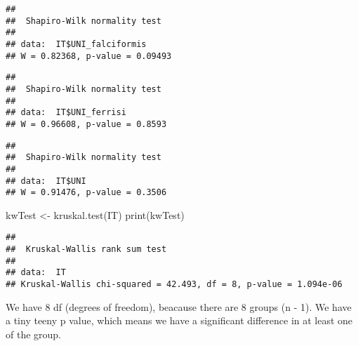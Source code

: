 \documentclass[
]{article}
\newenvironment{Shaded}{\begin{snugshade}}{\end{snugshade}}
\newcommand{\CommentTok}[1]{\textcolor[rgb]{0.56,0.35,0.01}{\textit{#1}}}
\newcommand{\FunctionTok}[1]{\textcolor[rgb]{0.00,0.00,0.00}{#1}}
\newcommand{\NormalTok}[1]{#1}
\newcommand{\OtherTok}[1]{\textcolor[rgb]{0.56,0.35,0.01}{#1}}
\newcommand{\SpecialCharTok}[1]{\textcolor[rgb]{0.00,0.00,0.00}{#1}}
\begin{document}
\begin{Shaded}
\end{Shaded}

\begin{verbatim}
## 
##  Shapiro-Wilk normality test
## 
## data:  IT$UNI_falciformis
## W = 0.82368, p-value = 0.09493
\end{verbatim}

\begin{Shaded}
\end{Shaded}

\begin{verbatim}
## 
##  Shapiro-Wilk normality test
## 
## data:  IT$UNI_ferrisi
## W = 0.96608, p-value = 0.8593
\end{verbatim}

\begin{Shaded}
\end{Shaded}

\begin{verbatim}
## 
##  Shapiro-Wilk normality test
## 
## data:  IT$UNI
## W = 0.91476, p-value = 0.3506
\end{verbatim}

\begin{Shaded}
\begin{Highlighting}[]
\NormalTok{kwTest }\OtherTok{\textless{}{-}} \FunctionTok{kruskal.test}\NormalTok{(IT)}
\FunctionTok{print}\NormalTok{(kwTest)}
\end{Highlighting}
\end{Shaded}

\begin{verbatim}
## 
##  Kruskal-Wallis rank sum test
## 
## data:  IT
## Kruskal-Wallis chi-squared = 42.493, df = 8, p-value = 1.094e-06
\end{verbatim}

We have 8 df (degrees of freedom), beacause there are 8 groups (n - 1).
We have a tiny teeny p value, which means we have a significant
difference in at least one of the group.
\end{document}
